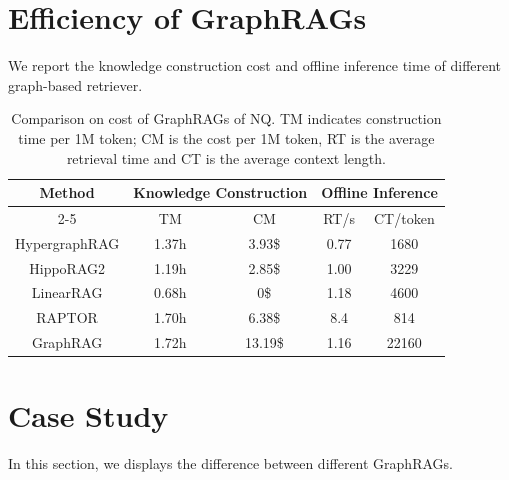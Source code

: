 \section{Efficiency of GraphRAGs}
We report the knowledge construction cost and offline inference time of different graph-based retriever. 
\begin{table}[!h]
\caption{Comparison on cost of GraphRAGs of NQ. TM indicates construction time per 1M token; CM is the cost per 1M token, RT is the average retrieval time and CT is the average context length.}
\label{tab:cost}
\begin{tabular}{c|cccc}
\hline
\multirow{2}{*}{Method} & \multicolumn{2}{c}{Knowledge Construction} & \multicolumn{2}{c}{Offline Inference} \\ \cline{2-5} 
                        & TM       & \multicolumn{1}{c|}{CM}         & \multicolumn{1}{c|}{RT/s}  & CT/token \\ \hline
HypergraphRAG           & 1.37h    & \multicolumn{1}{c|}{3.93\$}     & \multicolumn{1}{c|}{0.77}  & 1680     \\
HippoRAG2               & 1.19h    & \multicolumn{1}{c|}{2.85\$}     & \multicolumn{1}{c|}{1.00}     & 3229     \\
LinearRAG               & 0.68h    & \multicolumn{1}{c|}{0\$}        & \multicolumn{1}{c|}{1.18}  & 4600     \\
RAPTOR                  & 1.70h    & \multicolumn{1}{c|}{6.38\$}     & \multicolumn{1}{c|}{8.4}   & 814      \\
GraphRAG                & 1.72h    & \multicolumn{1}{c|}{13.19\$}    & \multicolumn{1}{c|}{1.16}  & 22160    \\ \hline
\end{tabular}
\end{table}
\section{Case Study}
In this section, we displays the difference between different GraphRAGs.

